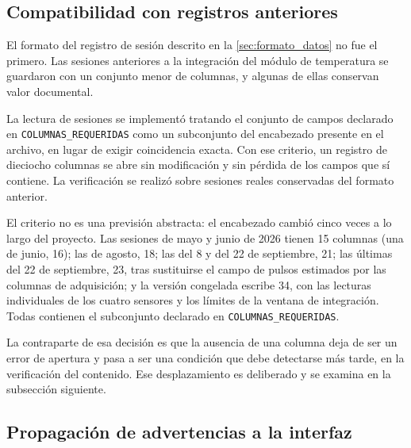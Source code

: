 
\subsection{Compatibilidad con registros anteriores}
\label{sec:val_compatibilidad}

El formato del registro de sesión descrito en la
\cref{sec:formato_datos} no fue el primero. Las sesiones anteriores a la
integración del módulo de temperatura se guardaron con un conjunto
menor de columnas, y algunas de ellas conservan valor documental.

La lectura de sesiones se implementó tratando el conjunto de campos
declarado en \texttt{COLUMNAS\_REQUERIDAS} como un subconjunto del
encabezado presente en el archivo, en lugar de exigir coincidencia
exacta. Con ese criterio, un registro de dieciocho columnas se abre sin
modificación y sin pérdida de los campos que sí contiene. La
verificación se realizó sobre sesiones reales conservadas del formato
anterior.

El criterio no es una previsión abstracta: el encabezado cambió cinco
veces a lo largo del proyecto. Las sesiones de mayo y junio de 2026
tienen 15 columnas (una de junio, 16); las de agosto, 18; las del 8 y
del 22 de septiembre, 21; las últimas del 22 de septiembre, 23, tras
sustituirse el campo de pulsos estimados por las columnas de
adquisición; y la versión congelada escribe 34, con las lecturas
individuales de los cuatro sensores y los límites de la ventana de
integración. Todas contienen el subconjunto declarado en
\texttt{COLUMNAS\_REQUERIDAS}.

La contraparte de esa decisión es que la ausencia de una columna deja de
ser un error de apertura y pasa a ser una condición que debe detectarse
más tarde, en la verificación del contenido. Ese desplazamiento es
deliberado y se examina en la subsección siguiente.


\subsection{Propagación de advertencias a la interfaz}
\label{sec:val_advertencias}

